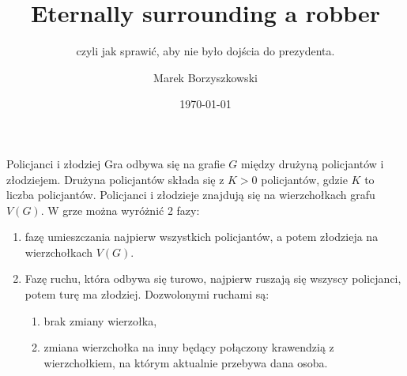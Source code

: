 \documentclass[polish]{beamer}
\title[Eternally surrounding a robber]{Eternally surrounding a robber}
\subtitle{czyli jak sprawić, aby nie było dojścia do prezydenta.}
\author{Marek Borzyszkowski}
\date{\today}
\begin{document}
\pgtitleframe



\begin{frame}{Policjanci i złodziej}
Gra odbywa się na grafie $G$ między drużyną policjantów i złodziejem. 
Drużyna policjantów składa się z $K>0$ policjantów, gdzie $K$ to liczba policjantów.
Policjanci i złodzieje znajdują się na wierzchołkach grafu $V\left(G\right)$. \pause
W grze można wyróżnić 2 fazy:
    \begin{enumerate}
        \item fazę umieszczania najpierw wszystkich policjantów, a potem złodzieja na wierzchołkach $V\left(G\right)$.
        \item Fazę ruchu, która odbywa się turowo, najpierw ruszają się wszyscy policjanci, potem turę ma złodziej. 
        Dozwolonymi ruchami są:
        \begin{enumerate}
            \item brak zmiany wierzołka,
            \item zmiana wierzchołka na inny będący połączony krawendzią z wierzchołkiem, 
            na którym aktualnie przebywa dana osoba.
        \end{enumerate} 
    \end{enumerate}
\end{frame}
\end{document}

